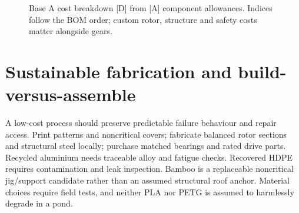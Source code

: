 \documentclass[11pt,a4paper]{article}
\begin{document}
\begin{figure}[htbp]\centering{}\caption{Base A cost breakdown [D] from [A] component allowances. Indices follow the BOM order; custom rotor, structure and safety costs matter alongside gears.}\end{figure}
\clearpage\section{Sustainable fabrication and build-versus-assemble}
A low-cost process should preserve predictable failure behaviour and repair access. Print patterns and noncritical covers; fabricate balanced rotor sections and structural steel locally; purchase matched bearings and rated drive parts. Recycled aluminium needs traceable alloy and fatigue checks. Recovered HDPE requires contamination and leak inspection. Bamboo is a replaceable noncritical jig/support candidate rather than an assumed structural roof anchor. Material choices require field tests, and neither PLA nor PETG is assumed to harmlessly degrade in a pond. \cite{materials,asa,recycle,khk}
\end{document}
